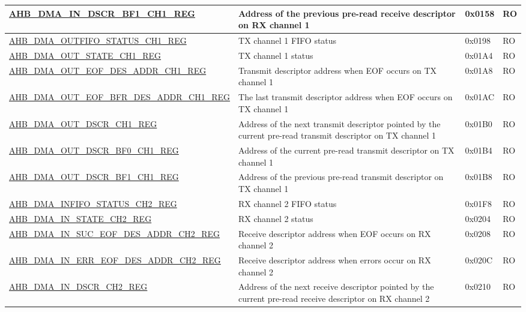 \begin{longtable}{ | l | p{10cm} | p{1.3cm} | l | }
\hyperref[regdesc:AHBDMAINDSCRBF1CHNREG]{AHB\_DMA\_IN\_DSCR\_BF1\_CH1\_REG} & Address of the previous pre-read receive descriptor on RX channel 1 & 0x0158 & RO \\ \hline
\hyperref[regdesc:AHBDMAOUTFIFOSTATUSCHNREG]{AHB\_DMA\_OUTFIFO\_STATUS\_CH1\_REG} & TX channel 1 FIFO status & 0x0198 & RO \\ \hline
\hyperref[regdesc:AHBDMAOUTSTATECHNREG]{AHB\_DMA\_OUT\_STATE\_CH1\_REG} & TX channel 1 status & 0x01A4 & RO \\ \hline
\hyperref[regdesc:AHBDMAOUTEOFDESADDRCHNREG]{AHB\_DMA\_OUT\_EOF\_DES\_ADDR\_CH1\_REG} & Transmit descriptor address when EOF occurs on TX channel 1 & 0x01A8 & RO \\ \hline
\hyperref[regdesc:AHBDMAOUTEOFBFRDESADDRCHNREG]{AHB\_DMA\_OUT\_EOF\_BFR\_DES\_ADDR\_CH1\_REG} & The last transmit descriptor address when EOF occurs on TX channel 1 & 0x01AC & RO \\ \hline
\hyperref[regdesc:AHBDMAOUTDSCRCHNREG]{AHB\_DMA\_OUT\_DSCR\_CH1\_REG} & Address of the next transmit descriptor pointed by the current pre-read transmit descriptor on TX channel 1 & 0x01B0 & RO \\ \hline
\hyperref[regdesc:AHBDMAOUTDSCRBF0CHNREG]{AHB\_DMA\_OUT\_DSCR\_BF0\_CH1\_REG} & Address of the current pre-read transmit descriptor on TX channel 1 & 0x01B4 & RO \\ \hline
\hyperref[regdesc:AHBDMAOUTDSCRBF1CHNREG]{AHB\_DMA\_OUT\_DSCR\_BF1\_CH1\_REG} & Address of the previous pre-read transmit descriptor on TX channel 1 & 0x01B8 & RO \\ \hline
\hyperref[regdesc:AHBDMAINFIFOSTATUSCHNREG]{AHB\_DMA\_INFIFO\_STATUS\_CH2\_REG} & RX channel 2 FIFO status & 0x01F8 & RO \\ \hline
\hyperref[regdesc:AHBDMAINSTATECHNREG]{AHB\_DMA\_IN\_STATE\_CH2\_REG} & RX channel 2 status & 0x0204 & RO \\ \hline
\hyperref[regdesc:AHBDMAINSUCEOFDESADDRCHNREG]{AHB\_DMA\_IN\_SUC\_EOF\_DES\_ADDR\_CH2\_REG} & Receive descriptor address when EOF occurs on RX channel 2 & 0x0208 & RO \\ \hline
\hyperref[regdesc:AHBDMAINERREOFDESADDRCHNREG]{AHB\_DMA\_IN\_ERR\_EOF\_DES\_ADDR\_CH2\_REG} & Receive descriptor address when errors occur on RX channel 2 & 0x020C & RO \\ \hline
\hyperref[regdesc:AHBDMAINDSCRCHNREG]{AHB\_DMA\_IN\_DSCR\_CH2\_REG} & Address of the next receive descriptor pointed by the current pre-read receive descriptor on RX channel 2 & 0x0210 & RO \\ \hline

\end{longtable}
